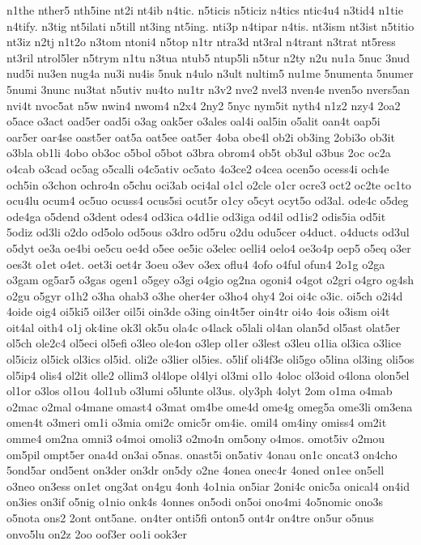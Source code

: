 {n1the
nther5
nth5ine
nt2i
nt4ib
n4tic.
n5ticis
n5ticiz
n4tics
ntic4u4
n3tid4
n1tie
n4tify.
n3tig
nt5ilati
n5till
nt3ing
nt5ing.
nti3p
n4tipar
n4tis.
nt3ism
nt3ist
n5titio
nt3iz
n2tj
n1t2o
n3tom
ntoni4
n5top
n1tr
ntra3d
nt3ral
n4trant
n3trat
nt5ress
nt3ril
ntrol5ler
n5trym
n1tu
n3tua
ntub5
ntup5li
n5tur
n2ty
n2u
nu1a
5nuc
3nud
nud5i
nu3en
nug4a
nu3i
nu4is
5nuk
n4ulo
n3ult
nultim5
nu1me
5numenta
5numer
5numi
3nunc
nu3tat
n5utiv
nu4to
nu1tr
n3v2
nve2
nvel3
nven4e
nven5o
nvers5an
nvi4t
nvoc5at
n5w
nwin4
nwom4
n2x4
2ny2
5nyc
nym5it
nyth4
n1z2
nzy4
2oa2
o5ace
o3act
oad5er
oad5i
o3ag
oak5er
o3ales
oal4i
oal5in
o5alit
oan4t
oap5i
oar5er
oar4se
oast5er
oat5a
oat5ee
oat5er
4oba
obe4l
ob2i
ob3ing
2obi3o
ob3it
o3bla
ob1li
4obo
ob3oc
o5bol
o5bot
o3bra
obrom4
ob5t
ob3ul
o3bus
2oc
oc2a
o4cab
o3cad
oc5ag
o5calli
o4c5ativ
oc5ato
4o3ce2
o4cea
ocen5o
ocess4i
och4e
och5in
o3chon
ochro4n
o5chu
oci3ab
oci4al
o1cl
o2cle
o1cr
ocre3
oct2
oc2te
oc1to
ocu4lu
ocum4
oc5uo
ocuss4
ocus5si
ocut5r
o1cy
o5cyt
ocyt5o
od3al.
ode4c
o5deg
ode4ga
o5dend
o3dent
odes4
od3ica
o4d1ie
od3iga
od4il
od1is2
odis5ia
od5it
5odiz
od3li
o2do
od5olo
od5ous
o3dro
od5ru
o2du
odu5cer
o4duct.
o4ducts
od3ul
o5dyt
oe3a
oe4bi
oe5cu
oe4d
o5ee
oe5ic
o3elec
oelli4
oelo4
oe3o4p
oep5
o5eq
o3er
oes3t
o1et
o4et.
oet3i
oet4r
3oeu
o3ev
o3ex
oflu4
4ofo
o4ful
ofun4
2o1g
o2ga
o3gam
og5ar5
o3gas
ogen1
o5gey
o3gi
o4gio
og2na
ogoni4
o4got
o2gri
o4gro
og4sh
o2gu
o5gyr
o1h2
o3ha
ohab3
o3he
oher4er
o3ho4
ohy4
2oi
oi4c
o3ic.
oi5ch
o2i4d
4oide
oig4
oi5ki5
oil3er
oil5i
oin3de
o3ing
oin4t5er
oin4tr
oi4o
4ois
o3ism
oi4t
oit4al
oith4
o1j
ok4ine
ok3l
ok5u
ola4c
o4lack
o5lali
ol4an
olan5d
ol5ast
olat5er
ol5ch
ole2c4
ol5eci
ol5efi
o3leo
ole4on
o3lep
ol1er
o3lest
o3leu
o1lia
ol3ica
o3lice
ol5iciz
ol5ick
ol3ics
ol5id.
oli2e
o3lier
ol5ies.
o5lif
oli4f3e
oli5go
o5lina
ol3ing
oli5os
ol5ip4
olis4
ol2it
olle2
ollim3
ol4lope
ol4lyi
ol3mi
o1lo
4oloc
ol3oid
o4lona
olon5el
ol1or
o3los
ol1ou
4ol1ub
o3lumi
o5lunte
ol3us.
oly3ph
4olyt
2om
o1ma
o4mab
o2mac
o2mal
o4mane
omast4
o3mat
om4be
ome4d
ome4g
omeg5a
ome3li
om3ena
omen4t
o3meri
om1i
o3mia
omi2c
omic5r
om4ie.
omil4
om4iny
omiss4
om2it
omme4
om2na
omni3
o4moi
omoli3
o2mo4n
om5ony
o4mos.
omot5iv
o2mou
om5pil
ompt5er
ona4d
on3ai
o5nas.
onast5i
on5ativ
4onau
on1c
oncat3
on4cho
5ond5ar
ond5ent
on3der
on3dr
on5dy
o2ne
4onea
onec4r
4oned
on1ee
on5ell
o3neo
on3ess
on1et
ong3at
on4gu
4onh
4o1nia
on5iar
2oni4c
onic5a
onical4
on4id
on3ies
on3if
o5nig
o1nio
onk4s
4onnes
on5odi
on5oi
ono4mi
4o5nomic
ono3s
o5nota
ons2
2ont
ont5ane.
on4ter
onti5fi
onton5
ont4r
on4tre
on5ur
o5nus
onvo5lu
on2z
2oo
oof3er
oo1i
ook3er
}
